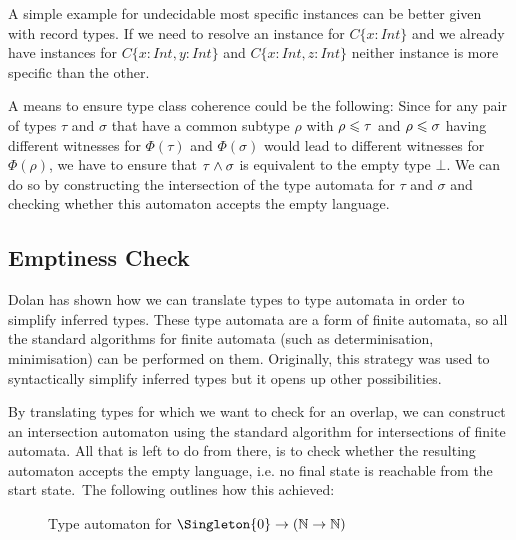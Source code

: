 A simple example for undecidable most specific instances can be better given with record types.
If we need to resolve an instance for $C \{x : Int\}$ and we already have instances for $C \{x : Int, y : Int\}$ and $C \{x : Int, z : Int\}$ neither instance is more specific than the other.


A means to ensure type class coherence could be the following:
Since for any pair of types $\tau$ and $\sigma$ that have a common subtype $\rho$ with $\rho \leqslant \tau$ and $\rho \leqslant \sigma$ having different witnesses for $\Phi(\tau)$ and $\Phi(\sigma)$ would lead to different witnesses for $\Phi(\rho)$,
we have to ensure that $\tau \wedge \sigma$ is equivalent to the empty type $\bot$.
We can do so by constructing the intersection of the type automata for $\tau$ and $\sigma$ and checking whether this automaton accepts the empty language.

\subsection{Emptiness Check}

Dolan \cite{downen2017phd} has shown how we can translate types to type automata in order to simplify inferred types.
These type automata are a form of finite automata, so all the standard algorithms for finite automata (such as determinisation, minimisation) can be performed on them.
Originally, this strategy was used to syntactically simplify inferred types but it opens up other possibilities.

By translating types for which we want to check for an overlap, we can construct an intersection automaton using the standard algorithm for intersections of finite automata.
All that is left to do from there, is to check whether the resulting automaton accepts the empty language,  i.e. no final state is reachable from the start state.\
The following outlines how this achieved:

\begin{figure}
  \centering
  \label{fig:example-type-automaton}
  \caption{Type automaton for $\Singleton{0} \to (\Nat \to \Nat)$}
\end{figure}

